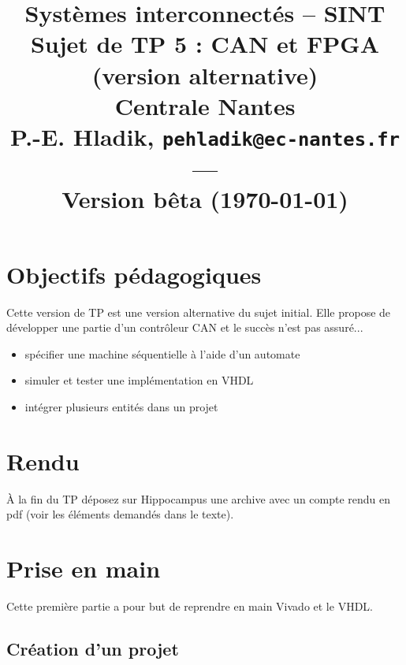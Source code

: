 \documentclass[11pt]{paper}
\title{{\Large Systèmes interconnectés -- SINT }\\
\vspace{-0.4em}
{\large Sujet de TP 5 : CAN et FPGA (version alternative)}\\
{\small Centrale Nantes}\\
\small P.-E. Hladik, \small{\texttt{pehladik@ec-nantes.fr}}\\
---\\
{\scriptsize  Version bêta (\today)}\\
}
\begin{document}
\maketitle


  \section{Objectifs pédagogiques}

Cette version de TP est une version alternative du sujet initial. Elle propose de développer une partie d'un contrôleur CAN et le succès n'est pas assuré...

\begin{itemize}
	\item spécifier une machine séquentielle à l'aide d'un automate
	\item simuler et tester une implémentation en VHDL
	\item intégrer plusieurs entités dans un projet
\end{itemize}

  \section{Rendu}

À la fin du TP déposez sur Hippocampus une archive avec un compte rendu en pdf (voir les éléments demandés dans le texte).

  \section{Prise en main}

Cette première partie a pour but de reprendre en main Vivado et le VHDL.

\subsection{Création d'un projet}
\end{document}

